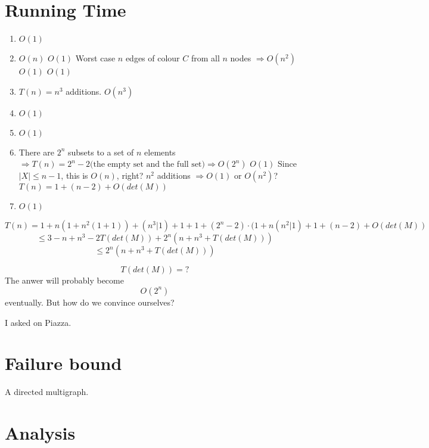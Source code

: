\documentclass{tufte-handout}
\begin{document}
\section{Running Time}
\begin{enumerate}
\item $O(1)$
\item $O(n)$
\subitem $O(1)$
\subitem Worst case $n$ edges of colour $C$ from all $n$ nodes $\Rightarrow O(n^2)$
\subsubitem $O(1)$
\subsubitem $O(1)$
\item $T(n) = n^3$ additions. $O(n^3)$
\item $O(1)$
\item $O(1)$
\item There are $2^n$ subsets to a set of $n$ elements $\Rightarrow T(n) = 2^n - 2\text{(the empty set and the full set)} \Rightarrow O(2^n)$
\subitem $O(1)$
\subitem Since $|X| \leq n-1$, this is $O(n)$, right?
\subsubitem $n^2$ additions $\Rightarrow O(1)$ or $O(n^2)$?
\subitem $T(n) = 1 + (n-2) + O(det(M))$
\item $O(1)$
\end{enumerate}


$$T(n) = 1 + n(1 + n^2(1 + 1)) + (n^3 | 1) + 1 + 1 + (2^n - 2)\cdot(1 + n(n^2 | 1) + 1 + (n - 2) + O(det(M))$$ 
$$ \leq 3 - n + n^3 - 2T(det(M)) + 2^n(n + n^3 + T(det(M)))$$
$$ \leq 2^n(n + n^3 + T(det(M)))$$

$$T(det(M)) = ?$$
The anwer will probably become
$$O(2^n)$$
eventually. But how do we convince ourselves?

I asked on Piazza.

\newpage
\section{Failure bound}



\begin{marginfigure}
\caption{A directed multigraph.}
\end{marginfigure}

\section{Analysis}
\end{document}
